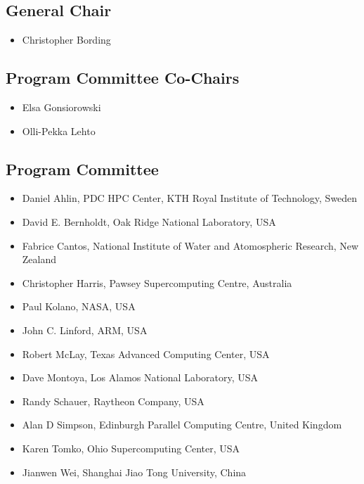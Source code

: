 \documentclass[11pt,a4paper]{article}
\begin{document}
\subsection{General Chair}
\begin{itemize}
\item Christopher Bording
\end{itemize}
\subsection{Program Committee Co-Chairs}

\begin{itemize}
\item Elsa Gonsiorowski
\item Olli-Pekka Lehto
\end{itemize}

\subsection{Program Committee}

\begin{itemize}
\item Daniel Ahlin, PDC HPC Center, KTH Royal Institute of Technology, Sweden
\item David E. Bernholdt, Oak Ridge National Laboratory, USA
\item Fabrice Cantos, National Institute of Water and Atomospheric Research, New Zealand
\item Christopher Harris, Pawsey Supercomputing Centre, Australia
\item Paul Kolano, NASA, USA
\item John C. Linford, ARM, USA
\item Robert McLay, Texas Advanced Computing Center, USA
\item Dave Montoya, Los Alamos National Laboratory, USA
\item Randy Schauer, Raytheon Company, USA
\item Alan D Simpson, Edinburgh Parallel Computing Centre, United Kingdom
\item Karen Tomko, Ohio Supercomputing Center, USA
\item Jianwen Wei, Shanghai Jiao Tong University, China
\end{itemize}
\end{document}
